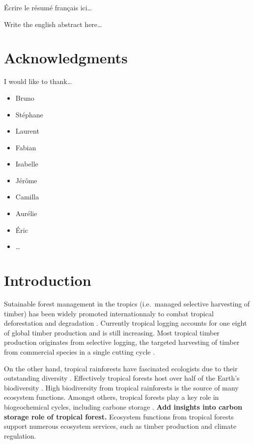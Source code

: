 \documentclass[12pt,]{article}
\providecommand{\tightlist}{%
\setlength{\itemsep}{0pt}\setlength{\parskip}{0pt}}
\let\oldsection\section
\renewcommand\section{\newpage\oldsection}
\theoremstyle{definition}
\theoremstyle{definition}
\theoremstyle{remark}
\begin{document}
Écrire le résumé français ici\ldots{}

Write the english abstract here\ldots{}

\section*{Acknowledgments}\label{acknowledgments}

I would like to thank\ldots{}

\begin{itemize}
\tightlist
\item
  Bruno
\item
  Stéphane
\item
  Laurent
\item
  Fabian
\item
  Isabelle
\item
  Jérôme
\item
  Camilla
\item
  Aurélie
\item
  Éric
\item
  \ldots{}
\end{itemize}

\section*{Introduction}\label{introduction}

Sutainable forest management in the tropics (i.e.~managed selective
harvesting of timber) has been widely promoted internationnaly to combat
tropical deforestation and degradation \citep{Zimmerman2012}. Currently
tropical logging accounts for one eight of global timber production
\citep{Blaser2011} and is still increasing. Most tropical timber
production originates from selective logging, the targeted harvesting of
timber from commercial species in a single cutting cycle
\citep{Martin2015}.

On the other hand, tropical rainforests have fascinated ecologists due
to their outstanding diversity \citep{connell_diversity_1978}.
Effectively tropical forests host over half of the Earth's biodiversity
\citep{Scheffers2012}. High biodiversity from tropical rainforests is
the source of many ecosystem functions. Amongst others, tropical forests
play a key role in biogeochemical cycles, including carbone storage
\citep{Lewis2004}. \textbf{Add insights into carbon storage role of
tropical forest.} Ecosystem functions from tropical forests support
numerous ecosystem services, such as timber production and climate
regulation.
\end{document}

